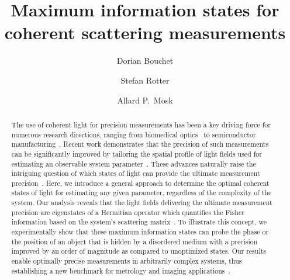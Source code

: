 \documentclass[aps,pra,twocolumn,amsmath,amssymb,superscriptaddress,10pt,nobibnotes]{revtex4-2}
\begin{document}
	

\title{Maximum information states for coherent scattering measurements}
\author{Dorian Bouchet}
\author{Stefan Rotter}
\author{Allard P.\ Mosk}


\begin{abstract}
The use of coherent light for precision measurements has been a key driving force for numerous research directions, ranging from biomedical optics~\cite{park_quantitative_2018,taylor_interferometric_2019} to semiconductor manufacturing~\cite{osten_optical_2012}. Recent work demonstrates that the precision of such measurements can be significantly improved by tailoring the spatial profile of light fields used for estimating an observable system parameter~\cite{van_putten_nonimaging_2012,shechtman_optimal_2014,balzarotti_nanometer_2017,ambichl_super-_2017,yuan_detecting_2019,juffmann_local_2020,bouchet_influence_2020}. 
These advances naturally raise the intriguing question of which states of light can provide the ultimate measurement precision~\cite{giovannetti_advances_2011}. 
Here, we introduce a general approach to determine the optimal coherent states of light for estimating any given parameter, regardless of the complexity of the system. 
Our analysis reveals that the light fields delivering the ultimate measurement precision are eigenstates of a Hermitian operator which quantifies the Fisher information based on the system's scattering matrix~\cite{rotter_light_2017}. To illustrate this concept, we experimentally show that these maximum information states can probe the phase or the position of an object that is hidden by a disordered medium with a precision improved by an order of magnitude as compared to unoptimized states. Our results enable optimally precise measurements in arbitrarily complex systems, thus establishing a new benchmark for metrology and imaging applications~\cite{osten_optical_2012,barrett_foundations_2013}.
\end{abstract}
\end{document}
